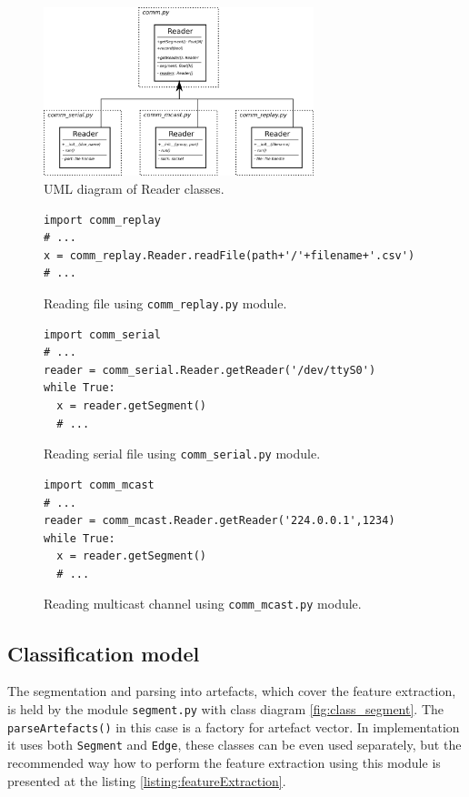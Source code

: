 \begin{figure}[!ht]
\begin{center}
\includegraphics[width=0.7\textwidth]{img/class_src.png}
\caption{UML diagram of Reader classes. \label{fig:class_src}}
\end{center}
\end{figure}

\begin{figure}[!ht]
\begin{lstlisting}[style=python]
import comm_replay
# ...
x = comm_replay.Reader.readFile(path+'/'+filename+'.csv')
# ...
\end{lstlisting}
\caption{Reading file using \texttt{comm\_replay.py} module.\label{listing:readFile}}
\end{figure}

\begin{figure}[!ht]
\begin{lstlisting}[style=python]
import comm_serial
# ...
reader = comm_serial.Reader.getReader('/dev/ttyS0')
while True:
  x = reader.getSegment()
  # ...
\end{lstlisting}
\caption{Reading serial file using \texttt{comm\_serial.py} module.\label{listing:readSerial}}
\end{figure}

\begin{figure}[!ht]
\begin{lstlisting}[style=python]
import comm_mcast
# ...
reader = comm_mcast.Reader.getReader('224.0.0.1',1234)
while True:
  x = reader.getSegment()
  # ...
\end{lstlisting}
\caption{Reading multicast channel using \texttt{comm\_mcast.py} module.\label{listing:readMCast}}
\end{figure}



\subsection*{Classification model}
The segmentation and parsing into artefacts, which cover the feature extraction, is held by the module \texttt{segment.py}
with class diagram \ref{fig:class_segment}. The \texttt{parseArtefacts()} in this case is a factory for artefact vector.
In implementation it uses both \texttt{Segment} and \texttt{Edge}, these classes can be even used separately,
but the recommended way how to perform the feature extraction using this module is presented at the listing
\ref{listing:featureExtraction}.


